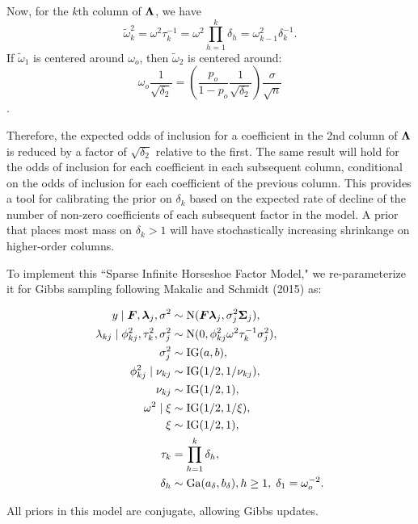 \documentclass[11pt]{amsart}
\newcommand*{\B}[1]{\ifmmode\bm{#1}\else\textbf{#1}\fi}
\begin{document}
Now, for the $k$th column of $\B\Lambda$, we have 
$$\tilde{\omega}^2_k = \omega^2\tau^{-1}_k = \omega^2 \prod\limits_{h=1}^k \delta_h = \omega^2_{k-1} \delta^{-1}_k.$$
\noindent If $\tilde{\omega}_1$ is centered around $\omega_o$, then $\tilde{\omega}_2$ is centered around:
$$\omega_o  \frac{1}{\sqrt{\delta_2}} = \left( \frac{p_o}{1-p_o} \frac{1}{\sqrt{\delta_2}}\right)\frac{\sigma}{\sqrt{n}}$$. 

Therefore, the expected odds of inclusion for a coefficient in the 2nd column of $\B\Lambda$ is reduced by a factor of $\sqrt{\delta_2}$ relative to the first. The same result will hold for the odds of inclusion for each coefficient in each subsequent column, conditional on the odds of inclusion for each coefficient of the previous column. This provides a tool for calibrating the prior on $\delta_k$ based on the expected rate of decline of the number of non-zero coefficients of each subsequent factor in the model. A prior that places most mass on $\delta_k > 1$ will have stochastically increasing shrinkange on higher-order columns.

To implement this ``Sparse Infinite Horseshoe Factor Model," we re-parameterize it for Gibbs sampling following Makalic and Schmidt (2015) as:


\begin{align*}
y \mid \B{F},\B{\lambda}_j,\sigma^2 &\sim \mbox{N}(\B{F}\B{\lambda}_j, \sigma^2_j\B{\Sigma}_j), \\
\lambda_{kj} \mid \phi^2_{kj}, \tau^2_k, \sigma^2_j &\sim \mbox{N}(0,\phi^2_{kj} \omega^2 \tau_k^{-1} \sigma^2_j), \\
\sigma^2_j &\sim \mbox{IG}(a,b), \\
\phi^2_{kj} \mid \nu_{kj} &\sim \mbox{IG}(1/2,1/\nu_{kj}), \\
\nu_{kj} &\sim \mbox{IG}(1/2,1), \\
\omega^2 \mid \xi &\sim \mbox{IG}(1/2,1/\xi), \\
\xi &\sim \mbox{IG}(1/2,1), \\
\tau_k &= \prod\limits_{h=1}^k \delta_h, \\
\delta_h &\sim \mbox{Ga}(a_\delta,b_\delta), h \geq 1, \; \delta_1 = \omega^{-2}_o.
\end{align*}

All priors in this model are conjugate, allowing Gibbs updates. 
\end{document}

